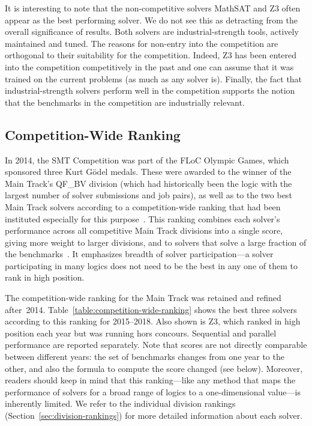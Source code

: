 \documentclass[dvipsnames,table,twoside,11pt]{article}
\newcommand{\maintrack}{Main Track\xspace}
\begin{document}
It is interesting to note that the non-competitive solvers MathSAT and Z3 often appear as the best performing solver. We do not see this as detracting from the overall significance of results. Both solvers are industrial-strength tools, actively maintained and tuned. The reasons for non-entry into the competition are orthogonal to their suitability for the competition. Indeed, Z3 has been entered into the competition competitively in the past and one can assume that it was trained on the current problems (as much as any solver is). Finally, the fact that industrial-strength solvers perform well in the competition supports the notion that the benchmarks in the competition are industrially relevant.








\subsection{Competition-Wide Ranking}
\label{sec:floc}

In 2014, the SMT Competition was part of the FLoC Olympic Games, which
sponsored three Kurt G\"odel medals.  These were awarded to the winner
of the \maintrack's QF\_BV division (which had historically been the
logic with the largest number of solver submissions and job pairs), as
well as to the two best \maintrack solvers according to a
competition-wide ranking that had been instituted especially for this
purpose~\cite{CDW14}.  This ranking combines each solver's performance
across all competitive \maintrack divisions into a single score,
giving more weight to larger divisions, and to solvers that solve a
large fraction of the benchmarks~\cite{rules18}.  It emphasizes
breadth of solver participation---a solver participating in many
logics does not need to be the best in any one of them to rank in high
position.

The competition-wide ranking for the \maintrack was retained and
refined after~2014.  Table~\ref{table:competition-wide-ranking} shows
the best three solvers according to this ranking for 2015--2018.  Also
shown is Z3, which ranked in high position each year but was running
hors concours.  Sequential and parallel performance are reported
separately.
%
Note that scores are not directly comparable between different years:
the set of benchmarks changes from one year to the other, and also the
formula to compute the score changed (see below).  Moreover, readers
should keep in mind that this ranking---like any method that maps the
performance of solvers for a broad range of logics to a
one-dimensional value---is inherently limited.  We refer to the
individual division rankings (Section~\ref{sec:division-rankings}) for
more detailed information about each solver.
\end{document}
